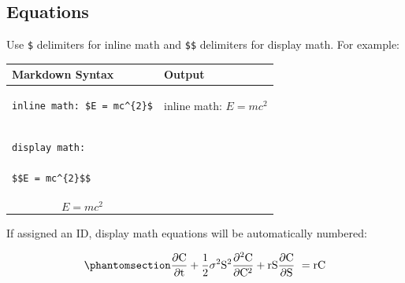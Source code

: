 \documentclass[
]{interact}
\newcounter{none} %
\begin{document}
\subsection{Equations}\label{equations}

Use \texttt{\$} delimiters for inline math and \texttt{\$\$} delimiters
for display math. For example:

{\def\LTcaptype{none} %
\begin{longtable}[]{@{}
  >{\raggedright\arraybackslash}p{}
  >{\raggedright\arraybackslash}p{}@{}}
\toprule\noalign{}
\begin{minipage}[b]{\linewidth}\raggedright
Markdown Syntax
\end{minipage} & \begin{minipage}[b]{\linewidth}\raggedright
Output
\end{minipage} \\
\midrule\noalign{}
\endhead
\bottomrule\noalign{}
\endlastfoot
\begin{minipage}[t]{\linewidth}\raggedright
\begin{verbatim}
inline math: $E = mc^{2}$
\end{verbatim}
\end{minipage} & inline math: \(E=mc^{2}\) \\
\begin{minipage}[t]{\linewidth}\raggedright
\begin{verbatim}
display math:

$$E = mc^{2}$$
\end{verbatim}
\end{minipage} & \begin{minipage}[t]{\linewidth}\raggedright
display math:\\
\[E = mc^{2}\]\strut
\end{minipage} \\
\end{longtable}
}

If assigned an ID, display math equations will be automatically
numbered:

\begin{equation}\protect\phantomsection\label{eq-black-scholes}{
\frac{\partial \mathrm C}{ \partial \mathrm t } + \frac{1}{2}\sigma^{2} \mathrm S^{2}
\frac{\partial^{2} \mathrm C}{\partial \mathrm C^2}
  + \mathrm r \mathrm S \frac{\partial \mathrm C}{\partial \mathrm S}\ =
  \mathrm r \mathrm C 
}\end{equation}
\end{document}
